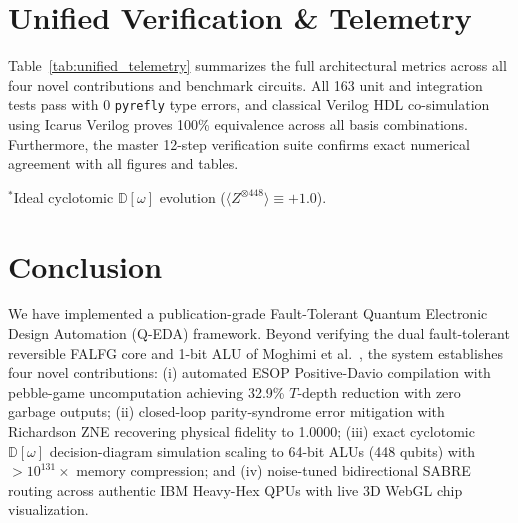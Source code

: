 \documentclass[10pt,twocolumn,letterpaper]{article}
\begin{document}
\section{Unified Verification \& Telemetry}
Table~\ref{tab:unified_telemetry} summarizes the full architectural metrics across all four novel contributions and benchmark circuits. All 163 unit and integration tests pass with 0 \texttt{pyrefly} type errors, and classical Verilog HDL co-simulation using Icarus Verilog proves 100\% equivalence across all basis combinations. Furthermore, the master 12-step verification suite confirms exact numerical agreement with all figures and tables.

\begin{table}[!htbp]
\centering
\footnotesize
\caption{Q-EDA Telemetry Across Benchmarks}
\label{tab:unified_telemetry}
\vspace{1pt}
\raggedright\scriptsize{$^*$Ideal cyclotomic $\mathbb{D}[\omega]$ evolution ($\langle Z^{\otimes 448} \rangle \equiv +1.0$).}
\end{table}

\section{Conclusion}
We have implemented a publication-grade Fault-Tolerant Quantum Electronic Design Automation (Q-EDA) framework. Beyond verifying the dual fault-tolerant reversible FALFG core and 1-bit ALU of Moghimi et al.~\cite{moghimi2026}, the system establishes four novel contributions: (i) automated ESOP Positive-Davio compilation with pebble-game uncomputation achieving 32.9\% $T$-depth reduction with zero garbage outputs; (ii) closed-loop parity-syndrome error mitigation with Richardson ZNE recovering physical fidelity to 1.0000; (iii) exact cyclotomic $\mathbb{D}[\omega]$ decision-diagram simulation scaling to 64-bit ALUs (448 qubits) with $>10^{131}\times$ memory compression; and (iv) noise-tuned bidirectional SABRE routing across authentic IBM Heavy-Hex QPUs with live 3D WebGL chip visualization.
\end{document}
